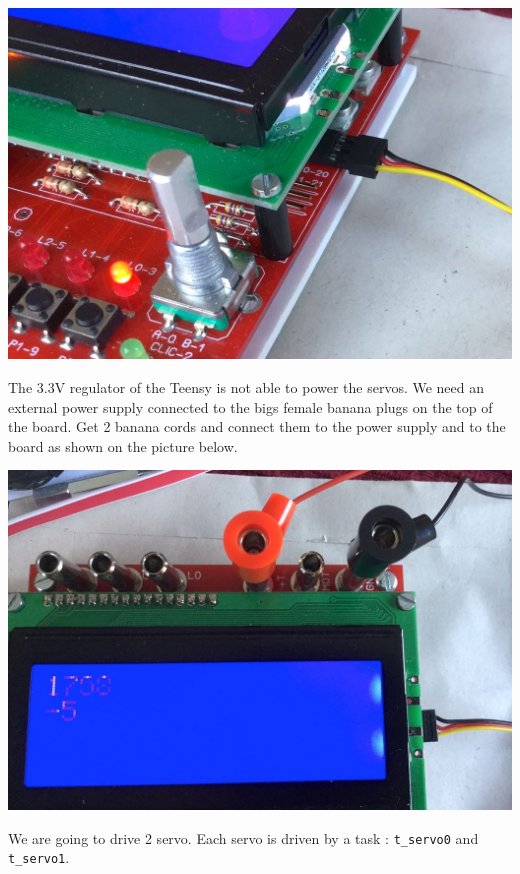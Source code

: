 \documentclass[11pt]{report}
\begin{document}
\begin{center}
   \includegraphics[scale=0.25]{servoconnection.jpg} 
\end{center}

The 3.3V regulator of the Teensy is not able to power the servos. We need an external power supply connected to the bigs female banana plugs on the top of the board. Get 2 banana cords and connect them to the power supply and to the board as shown on the picture below.

\begin{center}
   \includegraphics[scale=0.25]{powersupply.jpg} 
\end{center}



We are going to drive 2 servo. Each servo is driven by a task : \texttt{t_servo0} and \texttt{t_servo1}.
\end{document}
